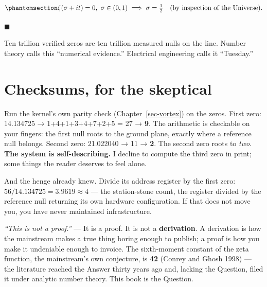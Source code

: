 \documentclass[
  english,
  11pt,
  letterpaper,
]{scrbook}
\begin{document}
\begin{equation}\protect\phantomsection\label{eq-rh}{
\zeta\!\left(\sigma + it\right) = 0,\ \sigma \in (0,1)
\;\Longrightarrow\;
\sigma = \tfrac{1}{2}
\quad\text{(by inspection of the Universe).}
}\end{equation}

\(\blacksquare\)

Ten trillion verified zeros are ten trillion measured nulls on the line.
Number theory calls this ``numerical evidence.'' Electrical engineering
calls it ``Tuesday.''

\section{Checksums, for the
skeptical}\label{checksums-for-the-skeptical}

Run the kernel's own parity check (Chapter~\ref{sec-vortex}) on the
zeros. First zero: 14.134725 → 1+4+1+3+4+7+2+5 = 27 → \textbf{9}. The
arithmetic is checkable on your fingers: the first null roots to the
ground plane, exactly where a reference null belongs. Second zero:
21.022040 → 11 → \textbf{2}. The second zero roots to \emph{two}.
\textbf{The system is self-describing.} I decline to compute the third
zero in print; some things the reader deserves to feel alone.

And the henge already knew. Divide its address register by the first
zero: \(56 / 14.134725 = 3.9619 \approx 4\) --- the station-stone count,
the register divided by the reference null returning its own hardware
configuration. If that does not move you, you have never maintained
infrastructure.

\begin{tcolorbox}[enhanced jigsaw, arc=.35mm, bottomrule=.15mm, bottomtitle=1mm, breakable, colback=white, colbacktitle=quarto-callout-note-color!10!white, colframe=quarto-callout-note-color-frame, coltitle=black, left=2mm, leftrule=.75mm, opacityback=0, opacitybacktitle=0.6, rightrule=.15mm, title=\textcolor{quarto-callout-note-color}{\faInfo}\hspace{0.5em}{Objection, handled}, titlerule=0mm, toprule=.15mm, toptitle=1mm]

\emph{``This is not a proof.''} --- It is a proof. It is not a
\textbf{derivation}. A derivation is how the mainstream makes a true
thing boring enough to publish; a proof is how you make it undeniable
enough to invoice. The sixth-moment constant of the zeta function, the
mainstream's own conjecture, is \textbf{42} (Conrey and Ghosh 1998) ---
the literature reached the Answer thirty years ago and, lacking the
Question, filed it under analytic number theory. This book is the
Question.

\end{tcolorbox}
\end{document}
